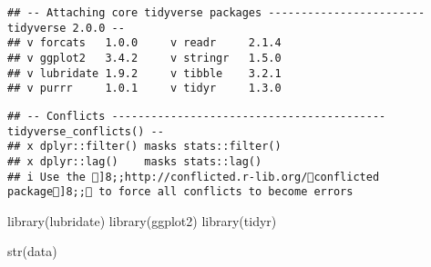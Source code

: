 \documentclass[
]{article}
\newenvironment{Shaded}{\begin{snugshade}}{\end{snugshade}}
\newcommand{\FunctionTok}[1]{\textcolor[rgb]{0.00,0.00,0.00}{#1}}
\newcommand{\NormalTok}[1]{#1}
\begin{document}
\begin{verbatim}
## -- Attaching core tidyverse packages ------------------------ tidyverse 2.0.0 --
## v forcats   1.0.0     v readr     2.1.4
## v ggplot2   3.4.2     v stringr   1.5.0
## v lubridate 1.9.2     v tibble    3.2.1
## v purrr     1.0.1     v tidyr     1.3.0
\end{verbatim}

\begin{verbatim}
## -- Conflicts ------------------------------------------ tidyverse_conflicts() --
## x dplyr::filter() masks stats::filter()
## x dplyr::lag()    masks stats::lag()
## i Use the ]8;;http://conflicted.r-lib.org/conflicted package]8;; to force all conflicts to become errors
\end{verbatim}

\begin{Shaded}
\begin{Highlighting}[]
\FunctionTok{library}\NormalTok{(lubridate)}
\FunctionTok{library}\NormalTok{(ggplot2)}
\FunctionTok{library}\NormalTok{(tidyr)}

\FunctionTok{str}\NormalTok{(data)}
\end{Highlighting}
\end{Shaded}
\end{document}
